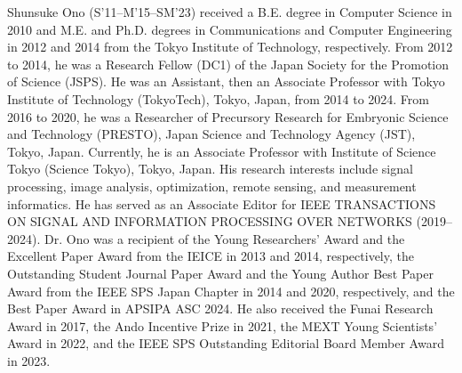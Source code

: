 \documentclass[10pt,journal]{IEEEtran}
\begin{document}

\begin{IEEEbiography}{Shunsuke Ono}
(S’11–M’15–SM'23) received a B.E. degree in Computer Science in 2010 and M.E. and Ph.D. degrees in Communications and Computer Engineering in 2012 and 2014 from the Tokyo Institute of Technology, respectively. From 2012 to 2014, he was a Research Fellow (DC1) of the Japan Society for the Promotion of Science (JSPS). He was an Assistant, then an Associate Professor with Tokyo Institute of Technology (TokyoTech), Tokyo, Japan, from 2014 to 2024. From 2016 to 2020, he was a Researcher of Precursory Research for Embryonic Science and Technology (PRESTO), Japan Science and Technology Agency (JST), Tokyo, Japan. Currently, he is an Associate Professor with Institute of Science Tokyo (Science Tokyo), Tokyo, Japan. His research interests include signal processing, image analysis, optimization, remote sensing, and measurement informatics. He has served as an Associate Editor for IEEE TRANSACTIONS ON SIGNAL AND INFORMATION PROCESSING OVER NETWORKS (2019--2024). Dr. Ono was a recipient of the Young Researchers’ Award and the Excellent Paper Award from the IEICE in 2013 and 2014, respectively, the Outstanding Student Journal Paper Award and the Young Author Best Paper Award from the IEEE SPS Japan Chapter in 2014 and 2020, respectively, and the Best Paper Award in APSIPA ASC 2024. He also received the Funai Research Award in 2017, the Ando Incentive Prize in 2021, the MEXT Young Scientists’ Award in 2022, and the IEEE SPS Outstanding Editorial Board Member Award in 2023. 
\end{IEEEbiography}




\vfill
\end{document}
